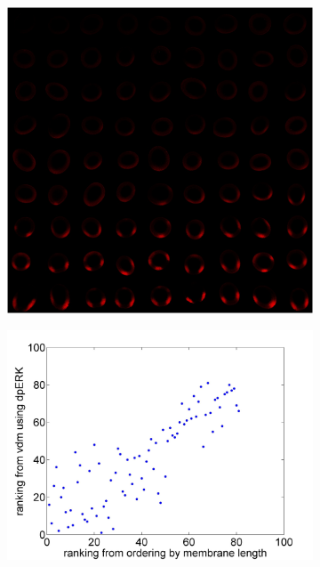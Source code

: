 \documentclass[11pt]{article}
\begin{document}
\begin{figure}
\begin{subfigure}{0.5\textwidth}
\includegraphics[width=\textwidth]{fig4a}
\caption{}
\end{subfigure}
\begin{subfigure}{0.5\textwidth}
\includegraphics[width=\textwidth]{dpERK_rank_corr}
\caption{}
\end{subfigure}
\begin{subfigure}{0.5\textwidth}

\end{subfigure}
\end{figure}
\end{document}

